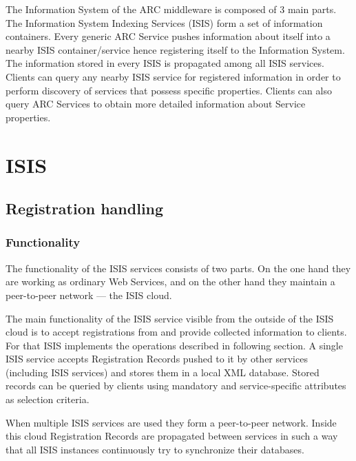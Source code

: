 \documentclass{book}
\begin{document}
The Information System of the ARC middleware is composed of 3 main parts. The Information System Indexing Services (ISIS) form a set of information containers. Every generic ARC Service pushes information about itself into a nearby ISIS container/service hence registering itself to the Information System. The information stored in every ISIS is propagated among all ISIS services. Clients can query any nearby ISIS service for registered information in order to perform discovery of services that possess specific properties. Clients can also query ARC Services to obtain more detailed information about Service properties.

\chapter{ISIS}
\label{cha:isis}

\section{Registration handling}
\label{sec:isis_registration_handling}

\subsection{Functionality}
\label{sub:isis_functionality}

 The functionality of the ISIS services consists of two parts. On the one hand they are working as ordinary Web Services, and on the other hand they maintain a peer-to-peer network --- the ISIS cloud.

 The main functionality of the ISIS service visible from the outside of the ISIS cloud is to accept registrations from and provide collected information to clients. For that ISIS implements the operations described in following section.
A single ISIS service accepts Registration Records pushed to it by other services (including ISIS services) and stores them in a local XML database. Stored records can be queried by clients using mandatory and service-specific attributes as selection criteria.

 When multiple ISIS services are used they form a peer-to-peer network. Inside this cloud Registration Records are propagated between services in such a way that all ISIS instances continuously try to synchronize their databases.


\end{document}
